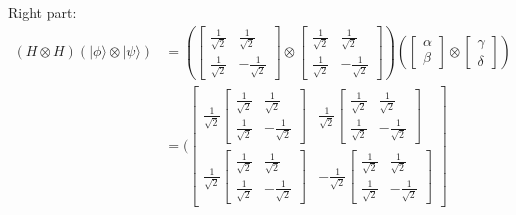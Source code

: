 \documentclass{article}
\begin{document}
Right part:
\begin{equation}
    \begin{split}
        (H \otimes H)(|\phi\rangle \otimes |\psi\rangle) & = (
            \begin{bmatrix}
                \frac{1}{\sqrt{2}} & \frac{1}{\sqrt{2}} \\
                \frac{1}{\sqrt{2}} & -\frac{1}{\sqrt{2}}
            \end{bmatrix} \otimes \begin{bmatrix}
                \frac{1}{\sqrt{2}} & \frac{1}{\sqrt{2}} \\
                \frac{1}{\sqrt{2}} & -\frac{1}{\sqrt{2}}
            \end{bmatrix}
        ) (
            \begin{bmatrix}
                \alpha \\ \beta
            \end{bmatrix} \otimes \begin{bmatrix}
                \gamma \\ \delta
            \end{bmatrix}
        ) \\
        & = (
            \begin{bmatrix}
                \frac{1}{\sqrt{2}}\begin{bmatrix}
                    \frac{1}{\sqrt{2}} & \frac{1}{\sqrt{2}} \\
                    \frac{1}{\sqrt{2}} & -\frac{1}{\sqrt{2}}
                \end{bmatrix} & \frac{1}{\sqrt{2}}\begin{bmatrix}
                    \frac{1}{\sqrt{2}} & \frac{1}{\sqrt{2}} \\
                    \frac{1}{\sqrt{2}} & -\frac{1}{\sqrt{2}}
                \end{bmatrix} \\
                \frac{1}{\sqrt{2}}\begin{bmatrix}
                    \frac{1}{\sqrt{2}} & \frac{1}{\sqrt{2}} \\
                    \frac{1}{\sqrt{2}} & -\frac{1}{\sqrt{2}}
                \end{bmatrix} & -\frac{1}{\sqrt{2}}\begin{bmatrix}
                    \frac{1}{\sqrt{2}} & \frac{1}{\sqrt{2}} \\
                    \frac{1}{\sqrt{2}} & -\frac{1}{\sqrt{2}}
                \end{bmatrix}

\end{bmatrix}
\end{split}
\end{equation}
\end{document}
